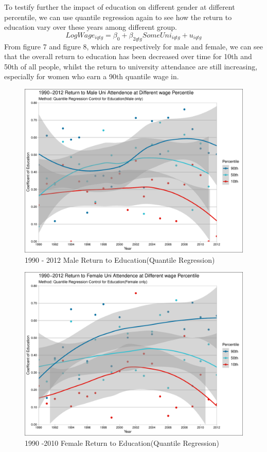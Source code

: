 \documentclass{article}
\begin{document}
To testify further the impact of education on different gender at different percentile,  we can use quantile regression again to see how the return to education vary over these years among different group.
\begin{equation}
    LogWage_{iqtg}=\beta_0+\beta_{2qtg}SomeUni_{iqtg}+u_{iqtg}
\end{equation}
From figure 7 and figure 8, which are respectively for male and female, we can see that the overall return to education has been decreased over time for 10th and 50th of all people, whilst the return to university attendance are still increasing, especially for women who earn a 90th quantile wage in.
\begin{figure}[H]
    \centering
    \includegraphics[width=120mm,scale=0.9]{q7p4.pdf}
    \caption{1990 - 2012 Male Return to Education(Quantile Regression)}
    \label{fig:my_label}
\end{figure}

\begin{figure}[H]
    \centering
    \includegraphics[width=120mm,scale=0.9]{q7p5.pdf}
    \caption{1990 -2010 Female Return to Education(Quantile Regression)}
    \label{fig:my_label}
\end{figure}
\end{document}
